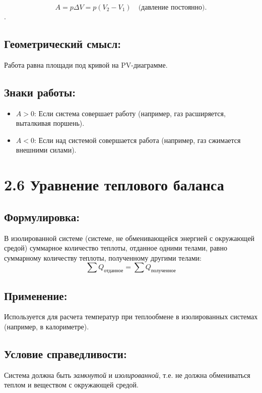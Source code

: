 \documentclass[a4paper,12pt]{article}
\begin{document}
$$ A = p \Delta V = p(V_2 - V_1) \quad \text{(давление постоянно).} $$.


\vspace{-9pt}
\subsection*{Геометрический смысл:}
\vspace{-3pt}
Работа равна площади под кривой на PV-диаграмме.

\vspace{-9pt}
\subsection*{Знаки работы:}
\vspace{-3pt}
\begin{itemize}
    \item $A > 0$: Если система совершает работу (например, газ расширяется, выталкивая поршень).
    \item $A < 0$: Если над системой совершается работа (например, газ сжимается внешними силами).
\end{itemize}


\section*{2.6 Уравнение теплового баланса}
\vspace{-9pt}
\subsection*{Формулировка:}
\vspace{-3pt}
В изолированной системе (системе, не обменивающейся энергией с окружающей средой) суммарное количество теплоты, отданное одними телами, равно суммарному количеству теплоты, полученному другими телами:
\vspace{-0.05em}
$$ \sum{Q_{\text{отданное}}} = \sum{Q_{\text{полученное}}} $$

\vspace{-9pt}
\subsection*{Применение:}
\vspace{-3pt}
Используется для расчета температур при теплообмене в изолированных системах (например, в калориметре).
\newpage
\vspace{-9pt}
\subsection*{Условие справедливости:}
\vspace{-3pt}
Система должна быть \textit{замкнутой} и \textit{изолированной}, т.е. не должна обмениваться теплом и веществом с окружающей средой.
\end{document}

